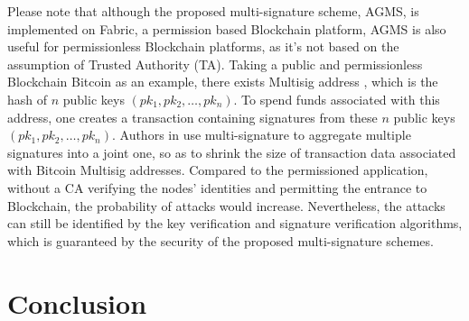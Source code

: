 \documentclass[journal]{IEEEtran}
\begin{document}
Please note that although the proposed multi-signature scheme, AGMS, is implemented on Fabric, a permission based Blockchain platform, AGMS is also useful for permissionless Blockchain platforms, as it's not based on the assumption of Trusted Authority (TA). Taking a public and permissionless Blockchain Bitcoin as an example, there exists Multisig address \cite{andresen2011m}, which is the hash of $n$ public keys $(pk_1,pk_2,\ldots,pk_n)$. To spend funds associated with this address, one creates a transaction containing signatures from these $n$ public keys $(pk_1,pk_2,\ldots,pk_n)$. Authors in \cite{DBLP:journals/dcc/MaxwellPSW19} use multi-signature to aggregate multiple signatures into a joint one, so as to shrink the size of transaction data associated with Bitcoin Multisig addresses. Compared to the permissioned application, without a CA verifying the nodes' identities and permitting the entrance to Blockchain, the probability of attacks would increase. Nevertheless, the attacks can still be identified by the key verification and signature verification algorithms, which is guaranteed by the security of the proposed multi-signature schemes.

\section{Conclusion}

\end{document}
